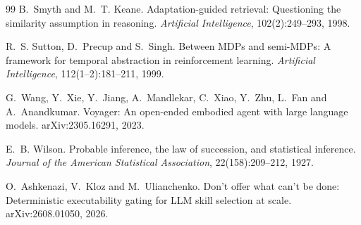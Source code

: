 \documentclass[11pt]{article}
\begin{document}
\begin{thebibliography}{99}
B.~Smyth and M.~T. Keane.
\newblock Adaptation-guided retrieval: Questioning the similarity assumption in reasoning.
\newblock \emph{Artificial Intelligence}, 102(2):249--293, 1998.

R.~S. Sutton, D.~Precup and S.~Singh.
\newblock Between {MDPs} and semi-{MDPs}: A framework for temporal abstraction in reinforcement
learning.
\newblock \emph{Artificial Intelligence}, 112(1--2):181--211, 1999.

G.~Wang, Y.~Xie, Y.~Jiang, A.~Mandlekar, C.~Xiao, Y.~Zhu, L.~Fan and A.~Anandkumar.
\newblock Voyager: An open-ended embodied agent with large language models.
\newblock arXiv:2305.16291, 2023.

E.~B. Wilson.
\newblock Probable inference, the law of succession, and statistical inference.
\newblock \emph{Journal of the American Statistical Association}, 22(158):209--212, 1927.

O.~Ashkenazi, V.~Kloz and M.~Ulianchenko.
\newblock Don't offer what can't be done: Deterministic executability gating for {LLM} skill
selection at scale.
\newblock arXiv:2608.01050, 2026.

\end{thebibliography}
\end{document}
